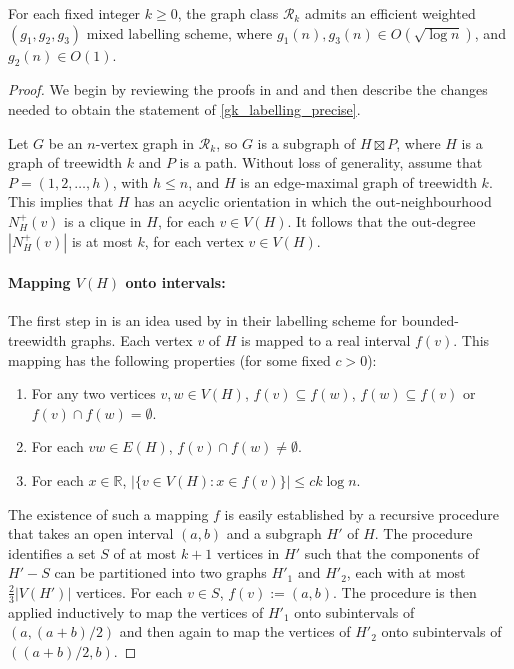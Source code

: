 \documentclass[twoside,leqno]{article}
\newcommand{\R}{\mathbb{R}}
\renewcommand{\ge}{\geqslant}
\renewcommand{\le}{\leqslant}
\newcommand{\defin}[1]{\emph{\textcolor{brightmaroon}{#1}}}
\newcommand{\Oh}{O}
\begin{document}
\begin{lem}\label{gk_labelling_precise}
  For each fixed integer $k\ge 0$, the graph class $\mathcal{R}_{k}$ admits an efficient weighted $(g_1,g_2,g_3)$ mixed labelling scheme, where $g_1(n),g_3(n)\in \Oh(\sqrt{\log n})$, and $g_2(n)\in \Oh(1)$.
\end{lem}

\begin{proof}
  We begin by reviewing the proofs in \cite{dujmovic.esperet.ea:adjacency} and \cite{gawrychowski.janczewski:simpler} and then describe the changes needed to obtain the statement of \cref{gk_labelling_precise}.

  Let $G$ be an $n$-vertex graph in $\mathcal{R}_k$, so $G$ is a subgraph of $H\boxtimes P$, where $H$ is a graph of treewidth $k$ and $P$ is a path. Without loss of generality, assume that $P=(1,2,\dots,h)$, with $h\le n$, and $H$ is an edge-maximal graph of treewidth $k$.  This implies that $H$ has an acyclic orientation in which the out-neighbourhood \defin{$N^+_H(v)$} is a clique in $H$, for each $v\in V(H)$. It follows that the out-degree $|N^+_H(v)|$ is at most $k$, for each vertex $v\in V(H)$.

  \paragraph{Mapping $V(H)$ onto intervals:}
  The first step in \cite{dujmovic.esperet.ea:adjacency} is an idea used by \citet{gavoille.labourel:shorter} in their labelling scheme for bounded-treewidth graphs.
  Each vertex $v$ of $H$ is mapped to a real interval \defin{$f(v)$}.
  This mapping has the following properties (for some fixed $c>0$):
  \begin{enumerate}[nosep,label=(I\arabic*)]
    \item\label{nested_or_disjoint} For any two vertices $v,w\in V(H)$, $f(v)\subseteq f(w)$, $f(w)\subseteq f(v)$ or $f(v)\cap f(w)=\emptyset$.
    \item\label{intersection_subgraph} For each $vw\in E(H)$, $f(v)\cap f(w)\neq\emptyset$.
    \item\label{thin} For each $x\in \R$, $|\{v\in V(H):x\in f(v)\}|\le ck\log n$.
  \end{enumerate}

  The existence of such a mapping $f$ is easily established by a recursive procedure that takes an open interval $(a,b)$ and a subgraph $H'$ of $H$.
  The procedure identifies a set $S$ of at most $k+1$ vertices in $H'$ such that the components of $H'-S$ can be partitioned into two graphs $H'_1$ and $H'_2$, each with at most $\tfrac{2}{3}|V(H')|$ vertices.
  For each $v\in S$, $f(v):=(a,b)$.  The procedure is then applied inductively to map the vertices of $H'_1$ onto subintervals of $(a,(a+b)/2)$ and then again to map the vertices of $H'_2$ onto subintervals of $((a+b)/2,b)$.


\end{proof}
\end{document}
